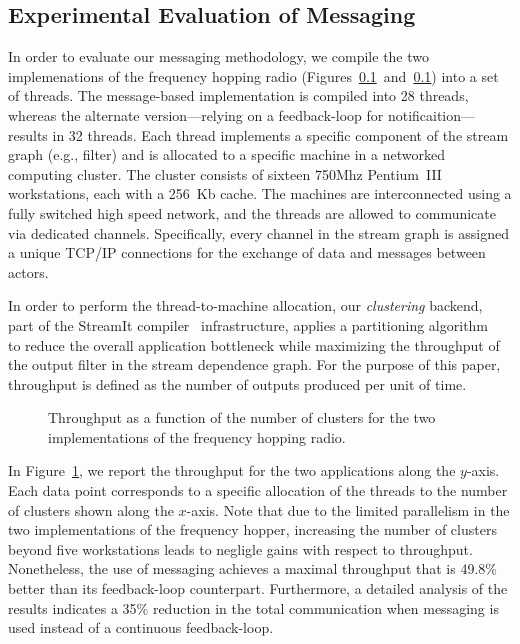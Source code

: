\subsection{Experimental Evaluation of Messaging}

In order  to evaluate  our messaging methodology,  we compile  the two
implemenations      of      the      frequency      hopping      radio
(Figures~\ref{}~and~\ref{}) into  a set of  threads. The message-based
implementation  is compiled  into  28 threads,  whereas the  alternate
version---relying on a feedback-loop for notificaition---results in 32
threads.  Each  thread implements a  specific component of  the stream
graph  (e.g., filter)  and is  allocated to  a specific  machine  in a
networked computing  cluster.  The cluster consists  of sixteen 750Mhz
Pentium~III workstations, each with  a 256~Kb cache.  The machines are
interconnected  using a  fully switched  high speed  network,  and the
threads     are    allowed     to     communicate    via     dedicated
channels. Specifically, every channel  in the stream graph is assigned
a  unique TCP/IP  connections for  the exchange  of data  and messages
between actors.

In  order  to  perform  the  thread-to-machine  allocation,  our  {\it
clustering}       backend,       part       of      the       StreamIt
compiler~\cite{streamit-compiler}     infrastructure,     applies    a
partitioning   algorithm~\cite{thies-msp}   to   reduce  the   overall
application bottleneck  while maximizing the throughput  of the output
filter in the stream dependence  graph. For the purpose of this paper,
throughput is  defined as the number  of outputs produced  per unit of
time.

\begin{figure}[t]
\caption{\small Throughput as a function of the number of clusters for
the two implementations of the frequency hopping radio.
\protect\label{fig:fhr-throughput}}
\end{figure}

In Figure~\ref{fig:fhr-throughput},  we report the  throughput for the
two applications along the $y$-axis.  Each data point corresponds to a
specific allocation  of the  threads to the  number of  clusters shown
along the $x$-axis.   Note that due to the  limited parallelism in the
two implementations of the  frequency hopper, increasing the number of
clusters beyond five workstations leads to negligle gains with respect
to throughput.   Nonetheless, the use of messaging  achieves a maximal
throughput   that   is    49.8\%   better   than   its   feedback-loop
counterpart. Furthermore, a detailed analysis of the results indicates
a 35\%  reduction in  the total communication  when messaging  is used
instead of a continuous feedback-loop.

